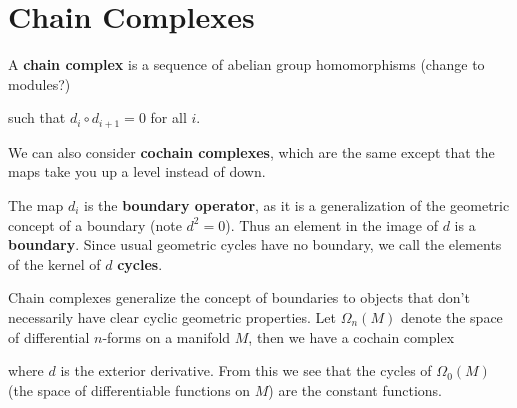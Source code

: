 \documentclass[twoside,10pt]{report}
\begin{document}
\tableofcontents


\section{Chain Complexes}

\begin{defn}[]
	A \textbf{chain complex} is a sequence of abelian group homomorphisms {\color{red}(change to modules?)}
\begin{center}
\end{center}
such that $d_i \circ d_{i+1}=0$ for all $i$.
\end{defn}

We can also consider \textbf{cochain complexes}, which are the same except that the maps take you up a level instead of down.
\begin{center}
\end{center}

The map $d_i$ is the \textbf{boundary operator}, as it is a generalization of the geometric concept of a boundary (note $d^2=0$). Thus an element in the image of $d$ is a \textbf{boundary}. Since usual geometric cycles have no boundary, we call the elements of the kernel of $d$ \textbf{cycles}.


\begin{ex}[]
	Chain complexes generalize the concept of boundaries to objects that don't necessarily have clear cyclic geometric properties. Let $\Omega_n(M)$ denote the space of differential $n$-forms on a manifold $M$, then we have a cochain complex
\begin{center}
\end{center}
where $d$ is the exterior derivative. From this we see that the cycles of $\Omega_0(M)$ (the space of differentiable functions on $M$) are the constant functions.
\end{ex}
\end{document}

